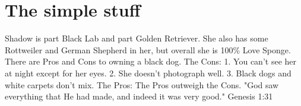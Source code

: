 \documentclass{article}%
\begin{document}
%
\normalsize%
\section{The simple stuff}%
\label{sec:Thesimplestuff}%
\newline%
Shadow is part Black Lab and part Golden Retriever. She also has some Rottweiler and German Shepherd in her, but overall she is 100\% Love Sponge.
 There are Pros and Cons to owning a black dog.
 The Cons:
 1. You can't see her at night except for her eyes.
2. She doesn't photograph well.
3. Black dogs and white carpets don't mix.
 The Pros:
     The Pros outweigh the Cons.
 "God saw everything that He had made, and indeed it was very good." Genesis 1:31  \newline%
\newline%

%
\end{document}
